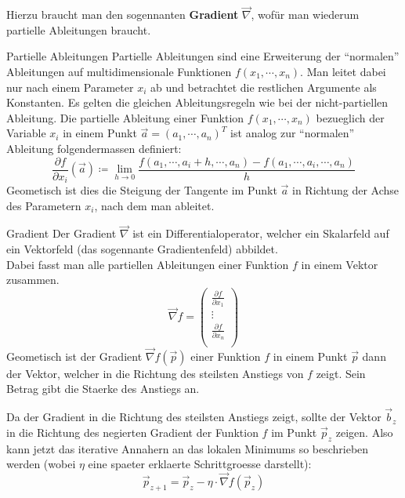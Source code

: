 \documentclass[../main]{subfiles}
\begin{document}
Hierzu braucht man den sogennanten \textbf{Gradient} $\vec{\nabla}$, wofür man wiederum partielle Ableitungen braucht.
\par\medskip

\begin{defbox}{Partielle Ableitungen}
  Partielle Ableitungen sind eine Erweiterung der ``normalen'' Ableitungen auf multidimensionale Funktionen $f(x_1,\cdots,x_n)$.
  Man leitet dabei nur nach einem Parameter $x_i$ ab und betrachtet die restlichen Argumente als Konstanten.
  Es gelten die gleichen Ableitungsregeln wie bei der nicht-partiellen Ableitung.
  Die partielle Ableitung einer Funktion $f(x_1,\cdots,x_n)$ bezueglich der Variable $x_i$ in einem Punkt $\vec{a}=(a_1,\cdots,a_n)^T$ ist analog zur ``normalen'' Ableitung folgendermassen definiert:
  \begin{equation*}
    \frac{\partial f}{\partial x_i}(\vec{a}) \coloneqq \lim_{h \to 0} \frac{f(a_1,\cdots,a_i + h,\cdots,a_n)-f(a_1,\cdots,a_i,\cdots,a_n)}{h}
  \end{equation*}
  Geometisch ist dies die Steigung der Tangente im Punkt $\vec{a}$ in Richtung der Achse des Parametern $x_i$, nach dem man ableitet.
\end{defbox}
    
\par\medskip

\begin{defbox}{Gradient}
  Der Gradient $\vec{\nabla}$ ist ein Differentialoperator, welcher ein Skalarfeld auf ein Vektorfeld (das sogennante Gradientenfeld) abbildet.\\
  Dabei fasst man alle partiellen Ableitungen einer Funktion $f$ in einem Vektor zusammen.
  \begin{equation*}
    \vec{\nabla}f=
    \begin{pmatrix}
      \frac{\partial f}{\partial x_1} \\
      \vdots \\
      \frac{\partial f}{\partial x_n} \\
    \end{pmatrix}
  \end{equation*}
  Geometisch ist der Gradient $\vec{\nabla}f(\vec{p})$ einer Funktion $f$ in einem Punkt $\vec{p}$ dann der Vektor, welcher in die Richtung des steilsten Anstiegs von $f$ zeigt.
  Sein Betrag gibt die Staerke des Anstiegs an.
\end{defbox}

Da der Gradient in die Richtung des steilsten Anstiegs zeigt, sollte der Vektor $\vec{b}_z$ in die Richtung des negierten Gradient der Funktion $f$ im Punkt $\vec{p}_z$ zeigen.
Also kann jetzt das iterative Annahern an das lokalen Minimums so beschrieben
werden (wobei $\eta$ eine spaeter erklaerte Schrittgroesse darstellt):\\
\begin{equation}\label{eq:gradientdescent}
  \vec{p}_{z+1} = \vec{p}_z - \eta \cdot \vec{\nabla} \mathit{f}(\vec{p}_z)
\end{equation}
\end{document}
